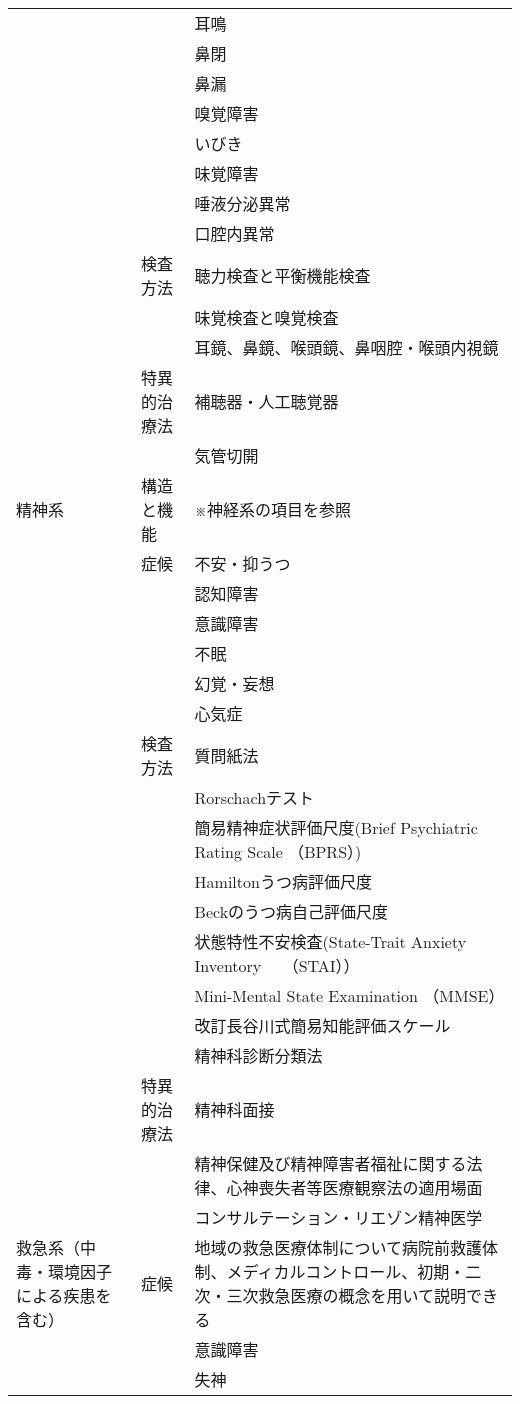 \begin{xltabular}{\linewidth}{XXX}
 &  & 耳鳴 \\
 &  & 鼻閉 \\
 &  & 鼻漏 \\
 &  & 嗅覚障害 \\
 &  & いびき \\
 &  & 味覚障害 \\
 &  & 唾液分泌異常 \\
 &  & 口腔内異常 \\
 & 検査方法 & 聴力検査と平衡機能検査 \\
 &  & 味覚検査と嗅覚検査 \\
 &  & 耳鏡、鼻鏡、喉頭鏡、鼻咽腔・喉頭内視鏡 \\
 & 特異的治療法 & 補聴器・人工聴覚器 \\
 &  & 気管切開 \\
精神系 & 構造と機能 & ※神経系の項目を参照 \\
 & 症候 & 不安・抑うつ \\
 &  & 認知障害 \\
 &  & 意識障害 \\
 &  & 不眠 \\
 &  & 幻覚・妄想 \\
 &  & 心気症 \\
 & 検査方法 & 質問紙法 \\
 &  & Rorschachテスト \\
 &  & 簡易精神症状評価尺度(Brief Psychiatric Rating Scale （BPRS）) \\
 &  & Hamiltonうつ病評価尺度 \\
 &  & Beckのうつ病自己評価尺度 \\
 &  & 状態特性不安検査(State-Trait Anxiety Inventory　 （STAI）） \\
 &  & Mini-Mental State Examination （MMSE） \\
 &  & 改訂長谷川式簡易知能評価スケール \\
 &  & 精神科診断分類法 \\
 & 特異的治療法 & 精神科面接 \\
 &  & 精神保健及び精神障害者福祉に関する法律、心神喪失者等医療観察法の適用場面 \\
 &  & コンサルテーション・リエゾン精神医学 \\
救急系（中毒・環境因子による疾患を含む） & 症候 & 地域の救急医療体制について病院前救護体制、メディカルコントロール、初期・二次・三次救急医療の概念を用いて説明できる \\
 &  & 意識障害 \\
 &  & 失神 \\

\end{xltabular}
